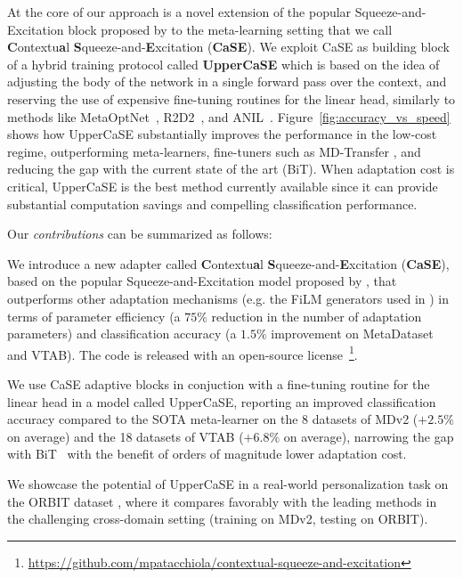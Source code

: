 \documentclass{article}
\begin{document}
At the core of our approach is a novel extension of the popular Squeeze-and-Excitation block proposed by \cite{hu2018squeeze} to the meta-learning setting that we call \textbf{C}ontextu\textbf{a}l \textbf{S}queeze-and-\textbf{E}xcitation (\textbf{CaSE}). We exploit CaSE as building block of a hybrid training protocol called \textbf{UpperCaSE} which is based on the idea of adjusting the body of the network in a single forward pass over the context, and reserving the use of expensive fine-tuning routines for the linear head, similarly to methods like MetaOptNet~\citep{lee2019meta}, R2D2~\citep{bertinetto2018meta}, and ANIL~\citep{raghu2019rapid}. Figure~\ref{fig:accuracy_vs_speed} shows how UpperCaSE substantially improves the performance in the low-cost regime, outperforming meta-learners, fine-tuners such as MD-Transfer \citep{triantafillou2019meta}, and reducing the gap with the current state of the art (BiT). When adaptation cost is critical, UpperCaSE is the best method currently available since it can provide substantial computation savings and compelling classification performance. 

Our \emph{contributions} can be summarized as follows:

\begin{compactenum}
\item We introduce a new adapter called \textbf{C}ontextu\textbf{a}l \textbf{S}queeze-and-\textbf{E}xcitation (\textbf{CaSE}), based on the popular Squeeze-and-Excitation model proposed by \cite{hu2018squeeze}, that outperforms other adaptation mechanisms (e.g. the FiLM generators used in \citealt{bronskill2021memory}) in terms of parameter efficiency (a $75\%$ reduction in the number of adaptation parameters) and classification accuracy (a $1.5\%$ improvement on MetaDataset and VTAB). The code is released with an open-source license~\footnote[1]{\url{https://github.com/mpatacchiola/contextual-squeeze-and-excitation}}.
    \item We use CaSE adaptive blocks in conjuction with a fine-tuning routine for the linear head in a model called UpperCaSE, reporting an improved classification accuracy compared to the SOTA meta-learner \citep{bronskill2021memory} on the 8 datasets of MDv2 ($+2.5\%$ on average) and the 18 datasets of VTAB ($+6.8\%$ on average), narrowing the gap with BiT~\citep{kolesnikov2020big} with the benefit of orders of magnitude lower adaptation cost.
    \item We showcase the potential of UpperCaSE 
    in a real-world personalization task on the ORBIT dataset \citep{massiceti2021orbit}, where it compares favorably with the leading methods in the challenging cross-domain setting (training on MDv2, testing on ORBIT).
\end{compactenum}
\end{document}
